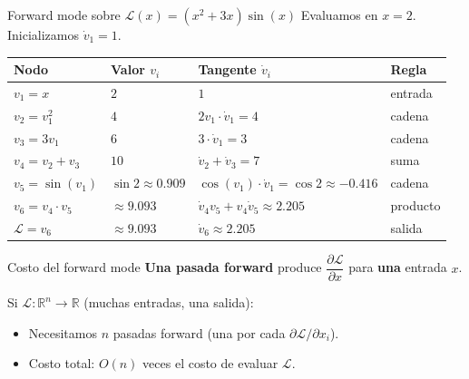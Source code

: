 \documentclass[aspectratio=169,10pt]{beamer}
\newcommand{\R}{\mathbb{R}}
\begin{document}
\begin{frame}{Forward mode sobre $\mathcal{L}(x) = (x^2+3x)\sin(x)$}
\vspace{4pt}
Evaluamos en $x = 2$. Inicializamos $\dot{v}_1 = 1$.

\vspace{6pt}
\begin{center}
\begin{tabular}{lll l}
\toprule
\textbf{Nodo} & \textbf{Valor} $v_i$ & \textbf{Tangente} $\dot{v}_i$ & \textbf{Regla} \\
\midrule
$v_1 = x$           & $2$            & $1$ & entrada \\
$v_2 = v_1^2$       & $4$            & $2 v_1 \cdot \dot{v}_1 = 4$ & cadena \\
$v_3 = 3 v_1$       & $6$            & $3 \cdot \dot{v}_1 = 3$ & cadena \\
$v_4 = v_2 + v_3$   & $10$           & $\dot{v}_2 + \dot{v}_3 = 7$ & suma \\
$v_5 = \sin(v_1)$   & $\sin 2 \approx 0.909$ & $\cos(v_1)\cdot \dot{v}_1 = \cos 2 \approx -0.416$ & cadena \\
$v_6 = v_4 \cdot v_5$ & $\approx 9.093$ & $\dot{v}_4 v_5 + v_4 \dot{v}_5 \approx 2.205$ & producto \\
$\mathcal{L} = v_6$ & $\approx 9.093$ & $\dot{v}_6 \approx 2.205$ & salida \\
\bottomrule
\end{tabular}
\end{center}

\end{frame}

\begin{frame}{Costo del forward mode}
\vspace{8pt}
\textbf{Una pasada forward} produce $\dfrac{\partial \mathcal{L}}{\partial x}$ para \textbf{una} entrada $x$.

\vspace{8pt}
Si $\mathcal{L}: \R^n \to \R$ (muchas entradas, una salida):

\vspace{8pt}
\begin{itemize}
  \item Necesitamos $n$ pasadas forward (una por cada $\partial \mathcal{L}/\partial x_i$). \vspace{8pt}
  \item Costo total: $O(n)$ veces el costo de evaluar $\mathcal{L}$.
\end{itemize}

\end{frame}
\end{document}
